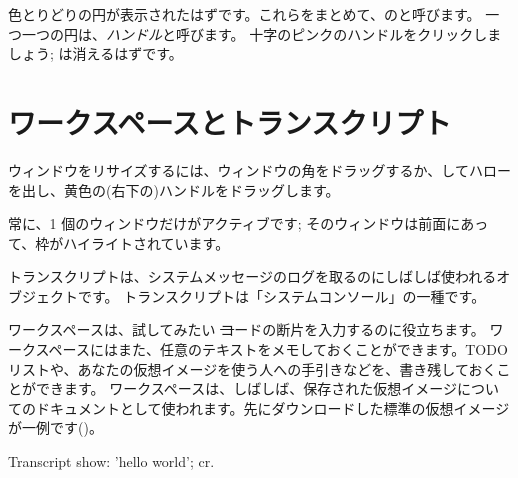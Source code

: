\documentclass[a4paper,10pt,twoside]{book}
\begin{document}
色とりどりの円が表示されたはずです。これらをまとめて、\bam のと呼びます。
一つ一つの円は、\emph{ハンドル}と呼びます。
十字のピンクのハンドルをクリックしましょう; \bam は消えるはずです。

\section{ワークスペースとトランスクリプト}


ウィンドウをリサイズするには、ウィンドウの角をドラッグするか、\metaclick してハローを出し、黄色の(右下の)ハンドルをドラッグします。

常に、1 個のウィンドウだけがアクティブです; そのウィンドウは前面にあって、枠がハイライトされています。

トランスクリプトは、システムメッセージのログを取るのにしばしば使われるオブジェクトです。
トランスクリプトは「システムコンソール」の一種です。

ワークスペースは、試してみたい \st コードの断片を入力するのに役立ちます。
ワークスペースにはまた、任意のテキストをメモしておくことができます。TODO リストや、あなたの仮想イメージを使う人への手引きなどを、書き残しておくことができます。
ワークスペースは、しばしば、保存された仮想イメージについてのドキュメントとして使われます。先にダウンロードした標準の仮想イメージが一例です()。

\begin{code}{}
Transcript show: 'hello world'; cr.
\end{code}
\end{document}
